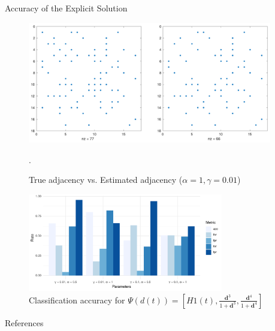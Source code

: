 \documentclass[xelatex]{beamer}
\newlength{\sepwidth}
\newlength{\colwidth}
\newcommand{\separatorcolumn}{\begin{column}{\sepwidth}\end{column}}
\begin{document}
\begin{frame}[t]
\begin{columns}[t]
\begin{column}{\colwidth}
  \begin{block}{Accuracy of the Explicit Solution}
	\begin{figure}
	\centering
	\includegraphics[width=\textwidth]{Image/adjfig}
	\caption{True adjacency vs. Estimated adjacency ($\alpha = 1, \gamma = 0.01$)}
	\label{fig:li_in}.
	\end{figure}
	\begin{figure}
		\includegraphics[width=0.8\textwidth]{Image/perf}
		\caption{Classification accuracy for $\Psi(d(t)) = \left[ \textit{H1}(t), \frac{\bm{d}^3}{1 + \bm{d}^ 3} , \frac{\bm{d}^4}{1 + \bm{d}^ 4}\right]$}
	\end{figure}
  \end{block}

  \begin{block}{References}

    \nocite{*}
    \footnotesize{}

  \end{block}

\end{column}

\separatorcolumn
\end{columns}
\end{frame}
\end{document}
